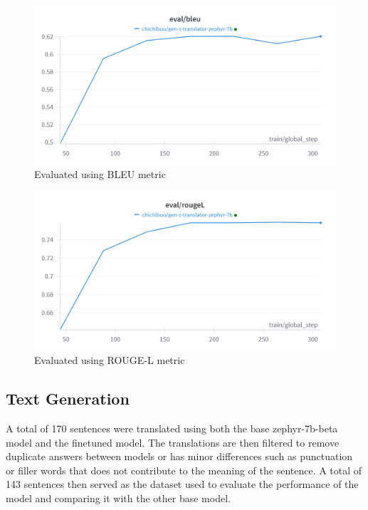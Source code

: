 \begin{figure}[!htbp]
	\centering
	\includegraphics[scale=0.2]{figures/BLEUEvaluation.png}
	\caption{Evaluated using BLEU metric}
	\label{fig:bleu_eval}
\end{figure}
\begin{figure}[!htbp]
	\centering
	\includegraphics[scale=0.2]{figures/ROUGELEvaluation.png}
	\caption{Evaluated using ROUGE-L metric}
	\label{fig:rouge_eval}
\end{figure}
\FloatBarrier
\subsection{Text Generation}
A total of 170 sentences were translated using both the base zephyr-7b-beta model and the finetuned model. The translations are then filtered to remove duplicate answers between models or has minor differences such as punctuation or filler words that does not contribute to the meaning of the sentence. A total of 143 sentences then served as the dataset used to evaluate the performance of the model and comparing it with the other base model.

